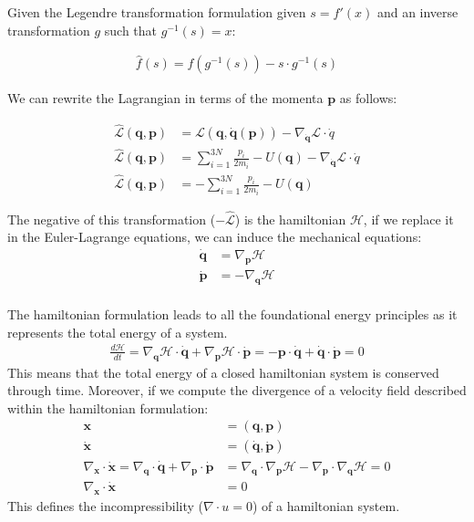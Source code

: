 \documentclass[draft]{agujournal2019}
\begin{document}
Given the Legendre transformation formulation given $s = f'(x)$ and an inverse transformation $g$ such that $g^{-1}(s) = x$:

\begin{align*}
    \hat{f}(s) = f(g^{-1}(s)) - s \cdot g^{-1}(s)
\end{align*}

We can rewrite the Lagrangian in terms of the momenta $\mathbf{p}$ as follows:

\begin{align*}
    \hat{\mathcal{L}}(\mathbf{q}, \mathbf{p}) &= \mathcal{L}(\mathbf{q}, \dot{\mathbf{q}}(\mathbf{p})) - \nabla_{\dot{\mathbf{q}}} \mathcal{L} \cdot \dot{q} \\
    \hat{\mathcal{L}}(\mathbf{q}, \mathbf{p}) &= \sum_{i = 1}^{3N} \frac{p_i}{2m_i} - U(\mathbf{q}) - \nabla_{\dot{\mathbf{q}}} \mathcal{L} \cdot \dot{q} \\
    \hat{\mathcal{L}}(\mathbf{q}, \mathbf{p}) &= - \sum_{i = 1}^{3N} \frac{p_i}{2m_i} - U(\mathbf{q})
\end{align*}

The negative of this transformation ($-\hat{\mathcal{L}}$) is the hamiltonian $\mathcal{H}$, if we replace it in the Euler-Lagrange equations, we can induce the mechanical equations:
\begin{align*}
    \dot{\mathbf{q}} &= \nabla_\mathbf{p} \mathcal{H} \\
    \dot{\mathbf{p}} &= - \nabla_\mathbf{q} \mathcal{H} \\
\end{align*}

\begin{definition}
    The hamiltonian formulation leads to all the foundational energy principles as it represents the total energy of a system.
    \begin{align*}
        \frac{d\mathcal{H}}{dt} = \nabla_\mathbf{q} \mathcal{H} \cdot \dot{\mathbf{q}} + \nabla_\mathbf{p} \mathcal{H} \cdot \dot{\mathbf{p}} = - \mathbf{p} \cdot \dot{\mathbf{q}} + \dot{\mathbf{q}} \cdot \dot{\mathbf{p}} = 0
    \end{align*}
    This means that the total energy of a closed hamiltonian system is conserved through time.
    Moreover, if we compute the divergence of a velocity field described within the hamiltonian formulation:
\begin{align*}
    \mathbf{x} &= (\mathbf{q}, \mathbf{p}) \\
    \dot{\mathbf{x}} &= (\dot{\mathbf{q}}, \dot{\mathbf{p}}) \\
    \nabla_\mathbf{x} \cdot \dot{\mathbf{x}} = \nabla_\mathbf{q} \cdot \dot{\mathbf{q}} + \nabla_\mathbf{p} \cdot \dot{\mathbf{p}} &= \nabla_\mathbf{q} \cdot \nabla_\mathbf{p} \mathcal{H} - \nabla_\mathbf{p} \cdot \nabla_\mathbf{q} \mathcal{H} = 0 \\
    \nabla_\mathbf{x} \cdot \dot{\mathbf{x}} &= 0
\end{align*}
This defines the incompressibility ($\nabla \cdot u = 0$) of a hamiltonian system.

\end{definition}
\end{document}
